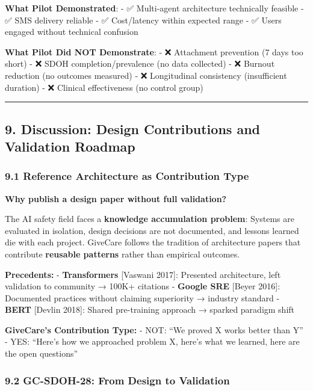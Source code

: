 \documentclass[
]{article}
\begin{document}
\textbf{What Pilot Demonstrated}: - ✅ Multi-agent architecture
technically feasible - ✅ SMS delivery reliable - ✅ Cost/latency within
expected range - ✅ Users engaged without technical confusion

\textbf{What Pilot Did NOT Demonstrate}: - ❌ Attachment prevention (7
days too short) - ❌ SDOH completion/prevalence (no data collected) - ❌
Burnout reduction (no outcomes measured) - ❌ Longitudinal consistency
(insufficient duration) - ❌ Clinical effectiveness (no control group)

\begin{center}\rule{0.5\linewidth}{0.5pt}\end{center}

\subsection{9. Discussion: Design Contributions and Validation
Roadmap}\label{discussion-design-contributions-and-validation-roadmap}

\subsubsection{9.1 Reference Architecture as Contribution
Type}\label{reference-architecture-as-contribution-type}

\textbf{Why publish a design paper without full validation?}

The AI safety field faces a \textbf{knowledge accumulation problem}:
Systems are evaluated in isolation, design decisions are not documented,
and lessons learned die with each project. GiveCare follows the
tradition of architecture papers that contribute \textbf{reusable
patterns} rather than empirical outcomes.

\textbf{Precedents:} - \textbf{Transformers} {[}Vaswani 2017{]}:
Presented architecture, left validation to community → 100K+ citations -
\textbf{Google SRE} {[}Beyer 2016{]}: Documented practices without
claiming superiority → industry standard - \textbf{BERT} {[}Devlin
2018{]}: Shared pre-training approach → sparked paradigm shift

\textbf{GiveCare's Contribution Type:} - NOT: ``We proved X works better
than Y'' - YES: ``Here's how we approached problem X, here's what we
learned, here are the open questions''

\subsubsection{9.2 GC-SDOH-28: From Design to
Validation}\label{gc-sdoh-28-from-design-to-validation}
\end{document}
